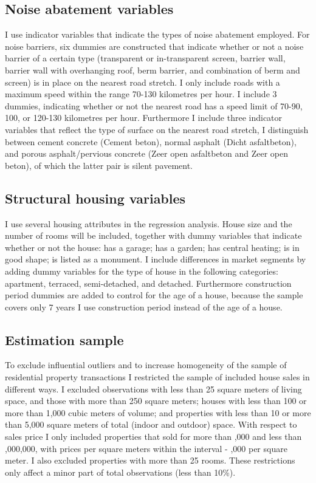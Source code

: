 \documentclass[12pt,a4paper]{scrartcl}
\begin{document}
        \subsection{Noise abatement variables}
		I use indicator variables that indicate the types of noise abatement employed. For noise barriers, six dummies are constructed that indicate whether or not a noise barrier of a certain type (transparent or in-transparent screen, barrier wall, barrier wall with overhanging roof, berm barrier, and combination of berm and screen) is in place on the nearest road stretch. I only include roads with a maximum speed within the range 70-130 kilometres per hour. I include 3 dummies, indicating whether or not the nearest road has a speed limit of 70-90, 100, or 120-130 kilometres per hour. Furthermore I include three indicator variables that reflect the type of surface on the nearest road stretch, I distinguish between cement concrete (Cement beton), normal asphalt (Dicht asfaltbeton), and porous asphalt/pervious concrete (Zeer open asfaltbeton and Zeer open beton), of which the latter pair is silent pavement.			
				
		\subsection{Structural housing variables}
        I use several housing attributes in the regression analysis. House size and the number of rooms will be included, together with dummy variables that indicate whether or not the house: has a garage; has a garden; has central heating; is in good shape; is listed as a monument. I include differences in market segments by adding dummy variables for the type of house in the following categories: apartment, terraced, semi-detached, and detached. Furthermore construction period dummies are added to control for the age of a house, because the sample covers only 7 years I use construction period instead of the age of a house.        
	
		\subsection{Estimation sample}
		To exclude influential outliers and to increase homogeneity of the sample of residential property transactions I restricted the sample of included house sales in different ways. I excluded observations with less than 25 square meters of living space, and those with more than 250 square meters; houses with less than 100 or more than 1,000 cubic meters of volume; and properties with less than 10 or more than 5,000 square meters of total (indoor and outdoor) space. With respect to sales price I only included properties that sold for more than ,000 and less than ,000,000, with prices per square meters within the interval  - ,000 per square meter. I also excluded properties with more than 25 rooms. These restrictions only affect a minor part of total observations (less than 10\%).
		
\end{document}
